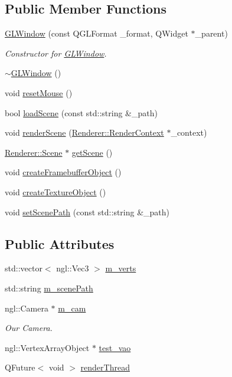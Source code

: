 \subsection*{Public Member Functions}
\begin{DoxyCompactItemize}
\item 
\hyperlink{classGLWindow_a54ae7036a8f059e9ea6a3b91064837c8}{G\+L\+Window} (const Q\+G\+L\+Format \+\_\+format, Q\+Widget $\ast$\+\_\+parent)
\begin{DoxyCompactList}\small\item\em Constructor for \hyperlink{classGLWindow}{G\+L\+Window}. \end{DoxyCompactList}\item 
\hyperlink{classGLWindow_a2eeaea2148f4f72344edd6d1bac9759b}{$\sim$\+G\+L\+Window} ()
\item 
void \hyperlink{classGLWindow_a7d68a4cf2db4ee1f485462595ffe7137}{reset\+Mouse} ()
\item 
bool \hyperlink{classGLWindow_aed7b270f88867c428887e7c43145988b}{load\+Scene} (const std\+::string \&\+\_\+path)
\item 
void \hyperlink{classGLWindow_afa32b188a2c32efb856380c59f966c50}{render\+Scene} (\hyperlink{structRenderer_1_1RenderContext}{Renderer\+::\+Render\+Context} $\ast$\+\_\+context)
\item 
\hyperlink{classRenderer_1_1Scene}{Renderer\+::\+Scene} $\ast$ \hyperlink{classGLWindow_a167f9005a38f79ca53b7ed0256b54076}{get\+Scene} ()
\item 
void \hyperlink{classGLWindow_a68504d141bb9f62168eb06773a105954}{create\+Framebuffer\+Object} ()
\item 
void \hyperlink{classGLWindow_a69aa7cac3d60aaa671ebecaff25c7bdb}{create\+Texture\+Object} ()
\item 
void \hyperlink{classGLWindow_a3eb6fe3b14f113249c0be33a5337e8fa}{set\+Scene\+Path} (const std\+::string \&\+\_\+path)
\end{DoxyCompactItemize}
\subsection*{Public Attributes}
\begin{DoxyCompactItemize}
\item 
std\+::vector$<$ ngl\+::\+Vec3 $>$ \hyperlink{classGLWindow_aac22ba5ee4eeec173f668f8cdf40fc76}{m\+\_\+verts}
\item 
std\+::string \hyperlink{classGLWindow_a5175cc7e618636fc7e3d6f8eb3e0dc39}{m\+\_\+scene\+Path}
\item 
ngl\+::\+Camera $\ast$ \hyperlink{classGLWindow_a55556dafb4fc86c35b270ca0d68f456e}{m\+\_\+cam}
\begin{DoxyCompactList}\small\item\em Our Camera. \end{DoxyCompactList}\item 
ngl\+::\+Vertex\+Array\+Object $\ast$ \hyperlink{classGLWindow_a90e0680c5b0aa5b2abdb2ddc4a82157e}{test\+\_\+vao}
\item 
Q\+Future$<$ void $>$ \hyperlink{classGLWindow_af84acb17ea1b3a5dde7abc9c85771447}{render\+Thread}
\end{DoxyCompactItemize}
